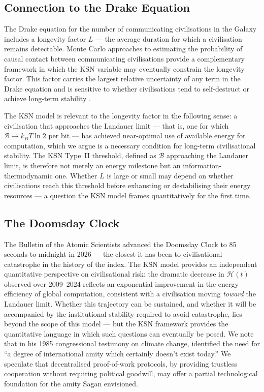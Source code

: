 \documentclass[final,5p,times,twocolumn,authoryear]{elsarticle}
\begin{document}
\subsection{Connection to the Drake Equation}
 
The Drake equation for the number of communicating
civilisations in the Galaxy includes a longevity factor $L$
--- the average duration for which a civilisation remains
detectable. Monte Carlo approaches to estimating the probability of causal contact between communicating civilisations \citep{Lares2020} provide a complementary framework in which the KSN variable may eventually constrain the longevity factor. This factor carries the largest relative
uncertainty of any term in the Drake equation and is
sensitive to whether civilisations tend to self-destruct
or achieve long-term stability \citep{gray2020}.
 
The KSN model is relevant to the longevity factor in the
following sense: a civilisation that approaches the Landauer
limit --- that is, one for which $\mathscr{B} \to k_B T \ln 2$ per
bit --- has achieved near-optimal use of available energy
for computation, which we argue is a necessary condition
for long-term civilisational stability. The KSN Type~II
threshold, defined as $\mathscr{B}$ approaching the Landauer limit,
is therefore not merely an energy milestone but an
information-thermodynamic one. Whether $L$ is large or
small may depend on whether civilisations reach this
threshold before exhausting or destabilising their energy
resources --- a question the KSN model frames quantitatively
for the first time.
 
\subsection{The Doomsday Clock}
 
The Bulletin of the Atomic Scientists advanced the
Doomsday Clock to 85 seconds to midnight in 2026 ---
the closest it has been to civilisational catastrophe in
the history of the index. The KSN model provides an
independent quantitative perspective on civilisational
risk: the dramatic decrease in $\mathcal{H}(t)$ observed over
2009--2024 reflects an exponential improvement in the
energy efficiency of global computation, consistent with
a civilisation moving \emph{toward} the Landauer limit.
Whether this trajectory can be sustained, and whether
it will be accompanied by the institutional stability
required to avoid catastrophe, lies beyond the scope of
this model --- but the KSN framework provides the
quantitative language in which such questions can
eventually be posed. We note that in his 1985
congressional testimony on climate change,
\citet{Sagan1985} identified the need for ``a degree of
international amity which certainly doesn't exist today.''
We speculate that decentralised proof-of-work protocols,
by providing trustless cooperation without requiring
political goodwill, may offer a partial technological
foundation for the amity Sagan envisioned.
\end{document}
